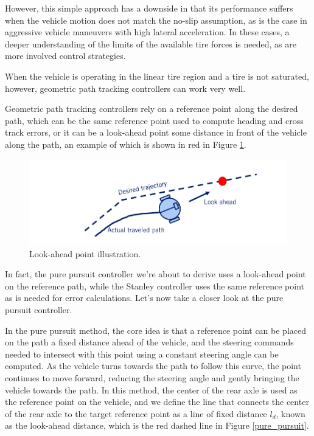 However, this simple approach has a downside in that its performance suffers when the vehicle motion does not match 
the no-slip assumption, as is the case in aggressive vehicle maneuvers with high lateral acceleration. 
In these cases, a deeper understanding of the limits of the available tire forces is needed, as are 
more involved control strategies. 

When the vehicle is operating in the linear tire region and a tire is not saturated, however, 
geometric path tracking controllers can work very well. 

Geometric path tracking controllers rely on a reference point along the desired path, which can be the same reference 
point used to compute heading and cross track errors, or it can be a look-ahead point some distance in front of the vehicle along the path, 
an example of which is shown in red in Figure \ref{look_ahead}. 

\begin{figure}[!htb]
\begin{center}
\includegraphics[scale=0.280]{img/lateral_control/look_ahead.jpeg}
\end{center}
\caption{Look-ahead point illustration.}
\label{look_ahead}
\end{figure}

In fact, the pure pursuit controller we're about to derive uses a look-ahead point on the reference path, 
while the Stanley controller uses the same reference point as is needed for error calculations. 
Let's now take a closer look at the pure pursuit controller. 

In the pure pursuit method, the core idea is that a reference point can be placed on the path a fixed distance ahead of the vehicle, 
and the steering commands needed to intersect with this point using a constant steering angle can be computed. 
As the vehicle turns towards the path to follow this curve, the point continues to move forward, 
reducing the steering angle and gently bringing the vehicle towards the path. 
In this method, the center of the rear axle is used as the reference point on the vehicle, and we define the line that connects 
the center of the rear axle to the target reference point as a line of fixed distance $l_d$, known as the look-ahead distance, which is the red dashed line in  Figure \ref{pure_pursuit}. 

